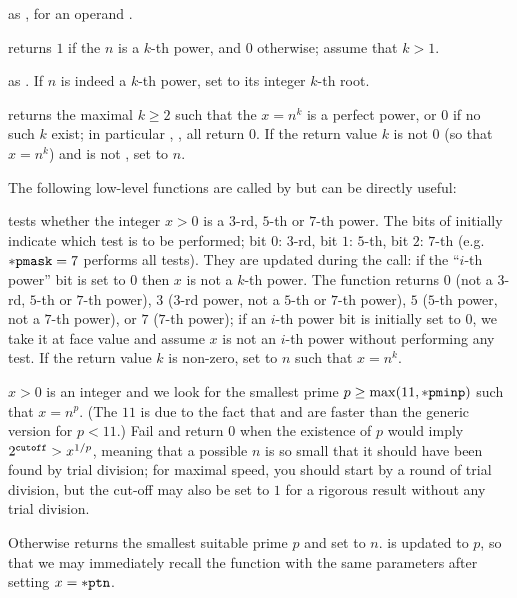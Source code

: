  as ,
for an  operand .

 returns $1$ if the  $n$ is a
$k$-th power, and $0$ otherwise; assume that $k > 1$.

 as . If
$n$ is indeed a $k$-th power, set  to its integer $k$-th root.

 returns the maximal $k\geq 2$  such
that the  $x = n^k$ is a perfect power, or $0$ if no such $k$ exist;
in particular , ,  all
return 0. If the return value $k$ is not $0$ (so that $x = n^k$) and
 is not , set  to $n$.

The following low-level functions are called by  but can
be directly useful:

 tests whether the
integer $x > 0$ is a $3$-rd, $5$-th or $7$-th power. The bits of 
initially indicate which test is to be performed;
bit $0$: $3$-rd,
bit $1$: $5$-th,
bit $2$: $7$-th (e.g.~${\tt *pmask} = 7$ performs all tests). They are
updated during the call: if the ``$i$-th power'' bit is set to $0$
then $x$ is not a $k$-th power. The function returns $0$
(not a
$3$-rd,
$5$-th or
$7$-th power),
$3$
($3$-rd power,
not a $5$-th or
$7$-th power),
$5$
($5$-th power,
not a $7$-th power),
or $7$
($7$-th power); if an $i$-th power bit is initially set to $0$, we take it
at face value and assume $x$ is not an $i$-th power without performing any
test. If the return value $k$ is non-zero, set  to $n$ such that $x
= n^k$.

$x > 0$ is an integer and we look for the smallest prime
$p \geq \max(11,{\tt *pminp})$ such that $x = n^p$. (The $11$ is due to the
fact that  and  are faster than
the generic version for $p < 11$.) Fail and return $0$ when the existence
of $p$ would imply $2^{{\tt cutoff}} > x^{1/p}$, meaning that a possible $n$
is so small that it should have been found by trial division; for maximal
speed, you should start by a round of trial division, but the cut-off may
also be set to $1$ for a rigorous result without any trial division.

Otherwise returns the smallest suitable prime $p$ and set  to $n$.
 is updated to $p$, so that we may immediately recall the
function with the same parameters after setting $x = {\tt *ptn}$.

